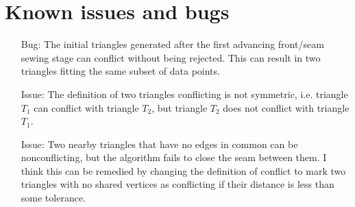 \documentclass[11pt]{amsart}
\begin{document}
\section{Known issues and bugs}
\begin{itemize}
\item[Bug:]
The initial triangles generated after the first advancing front/seam sewing stage can conflict without being rejected.
This can result in two triangles fitting the same subset of data points.

\item[Issue:]
The definition of two triangles conflicting is not symmetric, i.e. triangle $T_1$ can conflict with triangle $T_2$, but triangle $T_2$ does not conflict with triangle $T_1$.

\item[Issue:]
Two nearby triangles that have no edges in common can be nonconflicting, but the algorithm fails to close the seam between them.
I think this can be remedied by changing the definition of conflict to mark two triangles with no shared vertices as conflicting if their distance is less than some tolerance.
\end{itemize}
\end{document}
